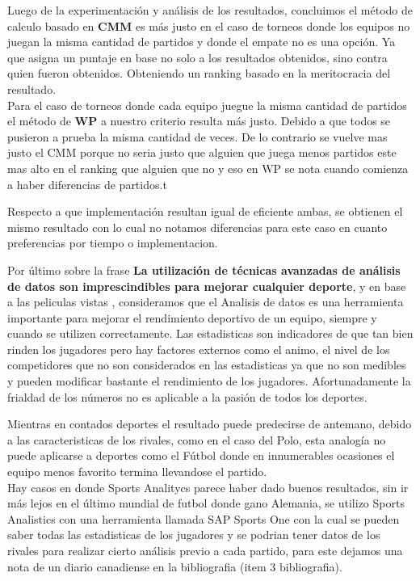 Luego de la experimentación y análisis de los resultados, concluimos el método de calculo basado en \textbf{CMM} es m\'as justo en el 
caso de torneos donde los equipos no juegan la misma cantidad de partidos y donde el empate no es una opción. Ya que asigna un puntaje 
en base no solo a los resultados obtenidos, sino contra quien fueron obtenidos. Obteniendo un ranking basado en la meritocracia del resultado. \\

Para el caso de torneos donde cada equipo juegue la misma cantidad de partidos el método de \textbf{WP} a nuestro criterio resulta m\'as justo. 
Debido a que todos se pusieron a prueba la misma cantidad de veces. De lo contrario se vuelve mas justo el CMM porque no seria justo que alguien que juega menos partidos
este mas alto en el ranking que alguien que no y eso en WP se nota cuando comienza a haber diferencias de partidos.t

Respecto a que implementación resultan igual de eficiente ambas, se obtienen el mismo resultado con lo cual no notamos diferencias para este caso en cuanto
preferencias por tiempo o implementacion.

Por último sobre la frase \textbf{La utilización de técnicas avanzadas de análisis de datos son imprescindibles para mejorar cualquier deporte}, 
 y en base a las peliculas vistas , consideramos que el Analisis de datos es una herramienta importante para mejorar el rendimiento deportivo de un equipo, 
siempre y cuando se utilizen correctamente. 
Las estadisticas son indicadores de que tan bien rinden los jugadores pero hay factores externos como el animo, el nivel de los competidores 
que no son considerados en las estadisticas ya que no son medibles y pueden modificar bastante el rendimiento de los jugadores.
Afortunadamente la frialdad de los números no es aplicable a la pasión de todos los deportes. 

Mientras en contados deportes el resultado puede predecirse de antemano, debido a las caracteristicas de los rivales, como en el caso del Polo, esta analogía no puede aplicarse a deportes como el Fútbol donde en innumerables ocasiones el equipo menos favorito termina llevandose el partido.\\
Hay casos en donde Sports Analitycs parece haber dado buenos resultados, sin ir m\'as lejos en el \'ultimo mundial de futbol donde gano Alemania, se utilizo Sports Analistics con una herramienta llamada SAP Sports One con la cual se pueden saber todas las estadisticas de los jugadores y se podrian tener datos de los rivales para realizar cierto an\'alisis previo a cada partido, para este dejamos una nota de un diario canadiense en la bibliografia (item 3 bibliografia).
